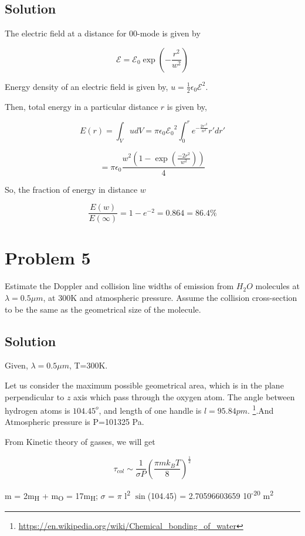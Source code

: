 \documentclass[a4paper,11pt]{article}
\begin{document}
\subsection*{Solution}
\label{sec:orgcaeec16}
The electric field at a distance for 00-mode is given by

$$\mathcal{E}=\mathcal{E}_0\exp\left(-\frac{r^2}{w^2}\right)$$

Energy density of an electric field is given by, \(u=\frac{1}{2}\epsilon_0\mathcal{E}^2\). 

Then, total energy in a particular distance \(r\) is given by,

$$E(r) = \int_V udV = \pi \epsilon_0 \mathcal{E_0}^2\int_0^r e^{-\frac{2r'^2}{w^2}} r'dr' $$ 

$$=\pi\epsilon_0\frac{w^2\left(1-\exp\left( \frac{-2 r^2}{w^2}\right)\right)}{4}$$

So, the fraction of energy in distance \(w\)

$$\frac{E(w)}{E(\infty)} = 1-e^{-2}=0.864 = 86.4\%$$

\section*{Problem 5}
\label{sec:orgd36f579}
Estimate the Doppler and collision line widths of emission from \(H_2O\) molecules at \(\lambda = 0.5\mu m\), at 300K and atmospheric pressure. Assume the collision cross-section to be the same as the geometrical size of the molecule.

\subsection*{Solution}
\label{sec:org0ea82e9}
Given, \(\lambda = 0.5\mu m\), T=300K.

Let us consider the maximum possible geometrical area, which is in the plane perpendicular to \(z\) axis which pass through the oxygen atom. The angle between hydrogen atoms is \(104.45^o\), and length of one handle is \(l=95.84 pm\). \footnote{\url{https://en.wikipedia.org/wiki/Chemical\_bonding\_of\_water}}.And Atmospheric pressure is P=101325 Pa.

From Kinetic theory of gasses, we will get

\begin{equation}
\label{eq:orgef8b558}
\tau_{col} \sim \frac{1}{\sigma P} \left(\frac{\pi m k_B T}{8}\right)^{\frac{1}{2}}
\end{equation}

m = 2m\textsubscript{H} + m\textsubscript{O} = 17m\textsubscript{H};
\(\sigma\) = \(\pi\) l\textsuperscript{2} \(\sin\)(104.45) = 2.70596603659\texttimes{} 10\textsuperscript{-20} m\textsuperscript{2} 
\end{document}
